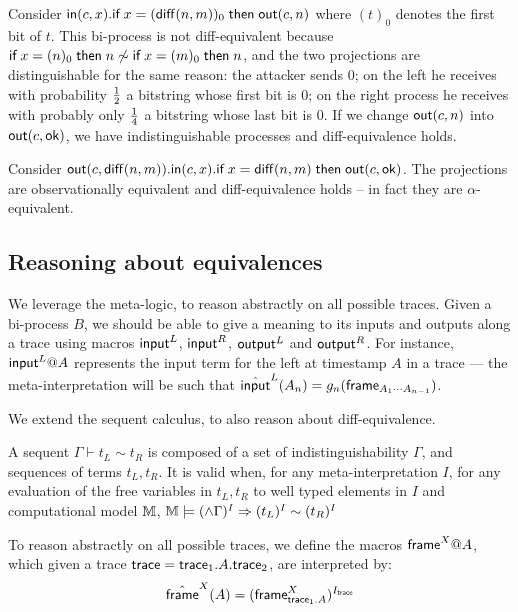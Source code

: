 \begin{example} \label{ex:sync}
  Consider
  $\mathsf{in}(c,x).\textsf{if}\; x=(\mathsf{diff}(n,m))_0 \;\textsf{then}\; \mathsf{out}(c,n)$
  where $(t)_0$ denotes the first bit of $t$.
  This bi-process is not diff-equivalent because
  $\textsf{if}\; x=(n)_0 \;\textsf{then}\; n \not\sim \textsf{if}\; x=(m)_0 \;\textsf{then}\; n$, and
  the two projections are distinguishable for the same
  reason: the attacker sends $0$;
  on the left he receives with probability $1\over 2$ a bitstring whose
  first bit is $0$;
  on the right process he receives with probably only $1\over 4$
  a bitstring whose last bit is $0$.
  If we change $\mathsf{out}(c,n)$ into $\mathsf{out}(c,\mathsf{ok})$,
  we have indistinguishable processes and diff-equivalence holds.
\end{example}

\begin{example} \label{ex:problem}
  Consider $\mathsf{out}(c,\mathsf{diff}(n,m)).
  \mathsf{in}(c,x).
  \textsf{if}\; x=\mathsf{diff}(n,m) \;\textsf{then}\; \mathsf{out}(c,\mathsf{ok})$.
  The projections are observationally equivalent and diff-equivalence
  holds -- in fact they are $\alpha$-equivalent.
\end{example}


\subsection{Reasoning about equivalences}

We leverage the meta-logic, to reason abstractly on all possible traces.
Given a bi-process $B$, we should be able to give a meaning to its inputs
and outputs along a trace using macros $\textsf{input}^L$, $\textsf{input}^R$, $\textsf{output}^L$
and $\textsf{output}^R$. For instance, $\textsf{input}^L@A$ represents the input term for
the left at timestamp $A$ in a trace --- the meta-interpretation will
be such that
$\hat{\textsf{input}}^L(A_n) = g_n( \textsf{frame}_{A_1\cdots A_{n-1}})$.

We extend the sequent calculus, to also reason about diff-equivalence.

\begin{definition}
  A sequent $\Gamma \vdash t_L \sim t_R $ is composed of a set of indistinguishability $\Gamma$, and sequences of terms $t_L,t_R$.
  It is valid when, for any meta-interpretation $I$, for any evaluation of the free variables in $t_L,t_R$ to well typed elements in $I$ and computational model $\mathbb{M}$, $\mathbb{M} \models (\wedge \Gamma)^I \Rightarrow (t_L)^I \sim  (t_R)^I $
\end{definition}

To reason abstractly on all possible traces, we define the macros $\textsf{frame}^X@A$, which given a trace $\textsf{trace} = \textsf{trace}_1 . A . \textsf{trace}_2$, are interpreted by:
$$\hat{\textsf{frame}}^X(A) = (\textsf{frame}_{\textsf{trace}_1.A}^X)^{I_{\textsf{trace}}} $$

